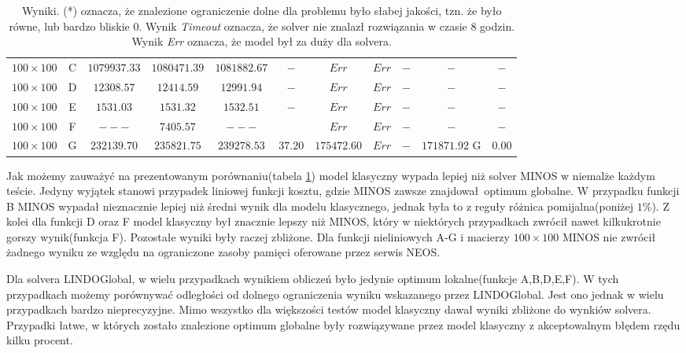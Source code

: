 \begin{table}[H]
\begin{center}
{\begin{tabular}{c|c||c|c|c|c||c||c|c||c|c}
            $100 \times 100$ & C           & $1079937.33$ & $1080471.39$ & $1081882.67$ & $-$   & $Err$         & $Err$ & $-$                     & $-$ & $-$ \\
            $100 \times 100$ & D           & $12308.57$ & $12414.59$ & $12991.94$ & $-$         & $Err$         & $Err$ & $-$                     & $-$ & $-$ \\
            $100 \times 100$ & E           & $1531.03$ & $1531.32$ & $1532.51$ & $-$            & $Err$         & $Err$ & $-$                     & $-$ & $-$ \\
            $100 \times 100$ & F           & $---$ & $7405.57$ & $---$ &                        & $Err$         & $Err$ & $-$                     & $-$ & $-$ \\
            $100 \times 100$ & G           & $232139.70$ & $235821.75$ & $239278.53$ & $37.20$  & $175472.60$   & $Err$ & $-$                     & $171871.92$ G & $0.00$ \\
        \end{tabular}
        } 
    \end{center}
    \caption{Wyniki. (*) oznacza, że znalezione ograniczenie dolne dla problemu było słabej jakości, tzn. że było równe, lub bardzo bliskie $0$. 
        Wynik \textit{Timeout} oznacza, że solver nie znalazł rozwiązania w czasie 8 godzin. 
        Wynik \textit{Err} oznacza, że model był za duży dla solvera.}
    \label{wyniki-1}
\end{table}


Jak możemy zauważyć na prezentowanym porównaniu(tabela \ref{wyniki-1}) model klasyczny wypada lepiej niż solver MINOS w niemalże każdym teście. Jedyny 
wyjątek stanowi przypadek liniowej funkcji kosztu, gdzie MINOS zawsze znajdował optimum globalne. W przypadku funkcji B MINOS wypadał nieznacznie 
lepiej niż średni wynik dla modelu klasycznego, jednak była to z reguły różnica pomijalna(poniżej $1\%$). Z kolei dla funkcji D oraz F model 
klasyczny był znacznie lepszy niż MINOS, który w niektórych przypadkach zwrócił nawet kilkukrotnie gorszy wynik(funkcja F). Pozostałe wyniki były raczej 
zbliżone. Dla funkcji nieliniowych A-G i macierzy $100 \times 100$ MINOS nie zwrócił żadnego wyniku ze względu na ograniczone zasoby pamięci oferowane 
przez serwis NEOS. 

Dla solvera LINDOGlobal, w wielu przypadkach wynikiem obliczeń było jedynie optimum lokalne(funkcje A,B,D,E,F). W tych przypadkach możemy 
porównywać odległości od dolnego ograniczenia wyniku wskazanego przez LINDOGlobal. Jest ono jednak w wielu przypadkach bardzo nieprecyzyjne. 
Mimo wszystko dla większości testów model klasyczny dawał wyniki zbliżone do wynkiów solvera. Przypadki łatwe, w których zostało znalezione optimum 
globalne były rozwiązywane przez model klasyczny z akceptowalnym błędem rzędu kilku procent.

